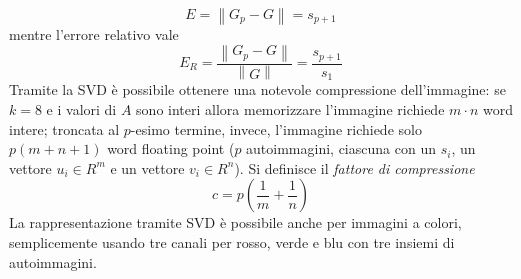 \documentclass[answers, a4paper]{exam}
\newcommand{\norm}[1]{\left\lVert#1\right\rVert}
\begin{document}
\begin{questions}
\begin{solution}
		\begin{equation}
			\label{eqn:svd_err}
			E = \norm{G_p - G} = s_{p + 1}
		\end{equation}
		mentre l'errore relativo vale 
		\begin{equation}
			\label{eqn:svd_err_rel}
			E_{R} = \frac{\norm{G_p - G}}{\norm{G}} = \frac{s_{p + 1}}{s_1}
		\end{equation}
		Tramite la SVD è possibile ottenere una notevole compressione dell'immagine: se $k = 8$ e i valori di $A$ sono interi allora memorizzare l'immagine richiede $m \cdot n$ word intere; troncata al $p$-esimo termine, invece, l'immagine richiede solo $p(m + n + 1)$ word floating point ($p$ autoimmagini, ciascuna con un $s_i$, un vettore $u_i \in R^m$ e un vettore $v_i \in R^n$).
		Si definisce il \textit{fattore di compressione}
		\begin{equation}
			c = p (\frac{1}{m} + \frac{1}{n})
		\end{equation}
		La rappresentazione tramite SVD è possibile anche per immagini a colori, semplicemente usando tre canali per rosso, verde e blu con tre insiemi di autoimmagini.
	\end{solution}

\end{questions}
\end{document}
